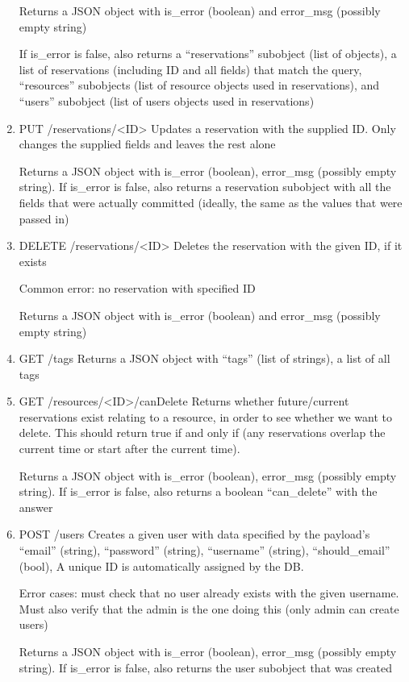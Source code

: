 \documentclass[12pt]{article}
\begin{document}
\begin{enumerate}
Returns a JSON object with is\_error (boolean) and error\_msg (possibly empty string)

If is\_error is false, also returns a ``reservations'' subobject (list of objects), a list of reservations (including ID and all fields) that match the query, ``resources'' subobjects (list of resource objects used in reservations), and ``users'' subobject (list of users objects used in reservations)

\item PUT /reservations/<ID>
Updates a reservation with the supplied ID. Only changes the supplied fields and leaves the rest alone

Returns a JSON object with is\_error (boolean), error\_msg (possibly empty string). If is\_error is false, also returns a reservation subobject with all the fields that were actually committed (ideally, the same as the values that were passed in)

\item DELETE /reservations/<ID>
Deletes the reservation with the given ID, if it exists

Common error: no reservation with specified ID

Returns a JSON object with is\_error (boolean) and error\_msg (possibly empty string)


\item GET /tags
Returns a JSON object with ``tags'' (list of strings), a list of all tags

\item GET /resources/<ID>/canDelete
Returns whether future/current reservations exist relating to a resource, in order to see whether we want to delete. This should return true if and only if (any reservations overlap the current time or start after the current time).

Returns a JSON object with is\_error (boolean), error\_msg (possibly empty string). If is\_error is false, also returns a boolean ``can\_delete'' with the answer

\item POST /users
Creates a given user with data specified by the payload's ``email'' (string), ``password'' (string), ``username'' (string), ``should\_email'' (bool), A unique ID is automatically assigned by the DB. 

Error cases: must check that no user already exists with the given username. Must also verify that the admin is the one doing this (only admin can create users)

Returns a JSON object with is\_error (boolean), error\_msg (possibly empty string). If is\_error is false, also returns the user subobject that was created


\end{enumerate}
\end{document}
